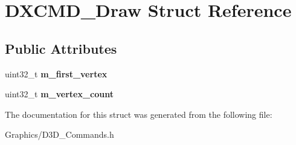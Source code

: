 \hypertarget{structDXCMD__Draw}{}\section{D\+X\+C\+M\+D\+\_\+\+Draw Struct Reference}
\label{structDXCMD__Draw}
\subsection*{Public Attributes}
\begin{DoxyCompactItemize}
\item 
\mbox{\label{structDXCMD__Draw_a68bb33f4c505dd72bd73105b988cde29}} 
uint32\+\_\+t {\bfseries m\+\_\+first\+\_\+vertex}
\item 
\mbox{\label{structDXCMD__Draw_a7b9050651081063c08207afb59032139}} 
uint32\+\_\+t {\bfseries m\+\_\+vertex\+\_\+count}
\end{DoxyCompactItemize}


The documentation for this struct was generated from the following file\+:\begin{DoxyCompactItemize}
\item 
Graphics/D3\+D\+\_\+\+Commands.\+h\end{DoxyCompactItemize}
